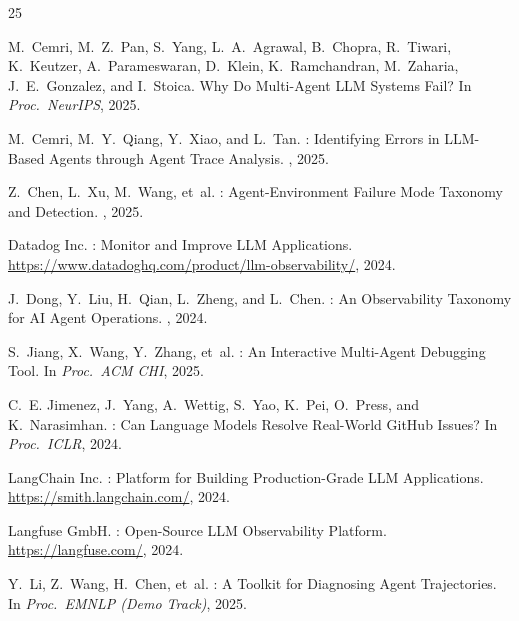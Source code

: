 \documentclass{article}
\begin{document}
\begin{thebibliography}{25}

M.~Cemri, M.~Z.~Pan, S.~Yang, L.~A.~Agrawal, B.~Chopra, R.~Tiwari,
  K.~Keutzer, A.~Parameswaran, D.~Klein, K.~Ramchandran, M.~Zaharia,
  J.~E.~Gonzalez, and I.~Stoica.
\newblock Why Do Multi-Agent {LLM} Systems Fail?
\newblock In {\em Proc.\ NeurIPS}, 2025.

M.~Cemri, M.~Y.~Qiang, Y.~Xiao, and L.~Tan.
: Identifying Errors in {LLM}-Based Agents through
  Agent Trace Analysis.
, 2025.

Z.~Chen, L.~Xu, M.~Wang, et~al.
: Agent-Environment Failure Mode Taxonomy and Detection.
, 2025.

{Datadog Inc.}
: Monitor and Improve {LLM} Applications.
\newblock \url{https://www.datadoghq.com/product/llm-observability/}, 2024.

J.~Dong, Y.~Liu, H.~Qian, L.~Zheng, and L.~Chen.
: An Observability Taxonomy for {AI} Agent Operations.
, 2024.

S.~Jiang, X.~Wang, Y.~Zhang, et~al.
: An Interactive Multi-Agent Debugging Tool.
\newblock In {\em Proc.\ ACM CHI}, 2025.

C.~E. Jimenez, J.~Yang, A.~Wettig, S.~Yao, K.~Pei, O.~Press, and
  K.~Narasimhan.
: Can Language Models Resolve Real-World {GitHub} Issues?
\newblock In {\em Proc.\ ICLR}, 2024.

{LangChain Inc.}
: Platform for Building Production-Grade {LLM}
  Applications.
\newblock \url{https://smith.langchain.com/}, 2024.

{Langfuse GmbH}.
: Open-Source {LLM} Observability Platform.
\newblock \url{https://langfuse.com/}, 2024.

Y.~Li, Z.~Wang, H.~Chen, et~al.
: A Toolkit for Diagnosing Agent Trajectories.
\newblock In {\em Proc.\ EMNLP (Demo Track)}, 2025.


\end{thebibliography}
\end{document}
